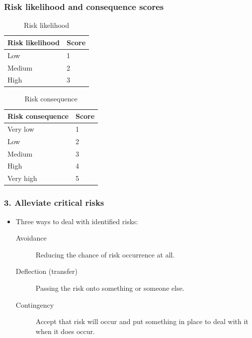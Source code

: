 \begin{frame}[t]\frametitle{Risk likelihood and consequence scores~\cite{dawson2005projects}}
\begin{table}[htb!]
    \caption{Risk likelihood}
    \label{tab:risk_likelihood}
    \begin{center}
        \begin{tabular}{l|l}
        \hline

        \hline
        \textbf{Risk likelihood} & \textbf{Score}\\
        \hline
         Low   & 1 \\
         Medium & 2 \\
         High & 3 \\
        \hline

        \hline
        \end{tabular}
    \end{center}
\end{table}

\begin{table}[htb!]
    \caption{Risk consequence}
    \label{tab:risk_consequence}
    \begin{center}
        \begin{tabular}{l|l}
        \hline

        \hline
        \textbf{Risk consequence} & \textbf{Score} \\
        \hline
        Very low & 1 \\
        Low & 2 \\
        Medium & 3 \\
        High & 4 \\
        Very high & 5\\
        \hline

        \hline
        \end{tabular}
    \end{center}
\end{table}
\end{frame}

\begin{frame}[t]\frametitle{3. Alleviate critical risks}
 \begin{itemize}
    	\item Three ways to deal with identified risks:
    	\begin{description}
    		\item [Avoidance] Reducing the chance of risk occurrence at all.
    		\item [Deflection (transfer)] Passing the risk onto something or someone else.
    		\item [Contingency] Accept that risk will occur and put something in place to deal with it when it does occur.
    	\end{description}
    \end{itemize}
\end{frame}

